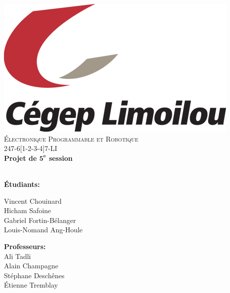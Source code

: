 \documentclass[10pt,a4paper,final]{article}
\begin{document}
\renewcommand\headrulewidth{0pt}
\fancyfoot[C]{ }






\begin{center}
\includegraphics[scale=1]{Figures/School_Logo.jpg}~\\[1cm]  
\textsc{\LARGE \'{E}lectronique Programmable et Robotique}\\[1.5cm]
\Large 247-6[1-2-3-4]7-LI\\[0.5cm]
{ \huge \bfseries Projet de $\mathbf{5^{e}}$ session \\[0.4cm] }
\HRule \\[1.5cm]





\begin{multicols}{2}
\begin{flushleft}



\textbf{Étudiants:}\\

\bigskip

Vincent Chouinard\\
Hicham Safoine\\
Gabriel Fortin-Bélanger\\ 
Louis-Nomand Ang-Houle\\




\end{flushleft}
\vfill
\begin{flushright}

\textbf{Professeurs:}\\
\medskip
Ali Tadli\\
Alain Champagne\\
Stéphane Deschênes\\
Étienne Tremblay\\




\end{flushright}
\end{multicols}
\end{center}
\end{document}
